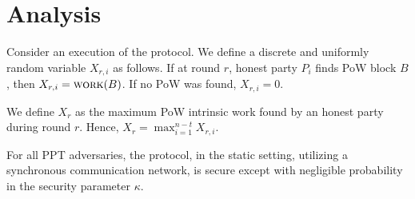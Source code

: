 \section{Analysis}

Consider an execution of the \poem protocol.
We define a discrete and uniformly random variable $X_{r, i}$ as follows.
If at round $r$, honest party $P_i$ finds PoW block $B$, then $X_{r, i} = \textsc{work}(B)$.
If no PoW was found, $X_{r, i} = 0$.

We define $X_{r}$ as the maximum PoW intrinsic work found by an honest party during
round $r$. Hence, $X_{r} = \max_{i = 1}^{n - t}{X_{r,i}}$.

\begin{conjecture}
  For all PPT adversaries, the \poem protocol, in
  the static setting, utilizing a synchronous communication network, is
  secure except with negligible probability in the security parameter $\kappa$.
\end{conjecture}
